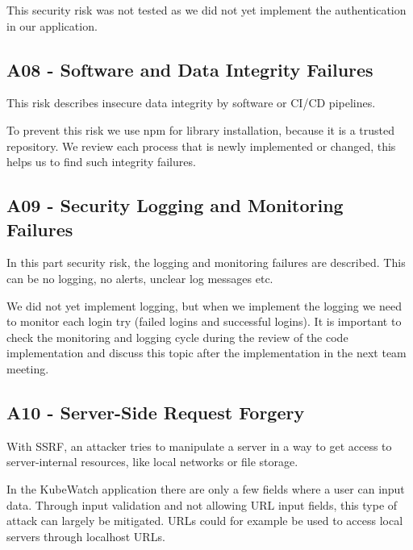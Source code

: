This security risk was not tested as we did not yet implement the authentication in our application.

\subsection{A08 - Software and Data Integrity Failures}
This risk describes insecure data integrity by software or CI/CD pipelines.

To prevent this risk we use npm for library installation, because it is a trusted repository. We review each process that is newly implemented or changed, this helps us to find such integrity failures.

\subsection{A09 - Security Logging and Monitoring Failures}
In this part security risk, the logging and monitoring failures are described. This can be no logging, no alerts, unclear log messages etc.

We did not yet implement logging, but when we implement the logging we need to monitor each login try (failed logins and successful logins). It is important to check the monitoring and logging cycle during the review of the code implementation and discuss this topic after the implementation in the next team meeting.

\subsection{A10 - Server-Side Request Forgery}
With SSRF, an attacker tries to manipulate a server in a way to get access to server-internal resources, like local networks or file storage.

In the KubeWatch application there are only a few fields where a user can input data. Through input validation and not allowing URL input fields, this type of attack can largely be mitigated. URLs could for example be used to access local servers through localhost URLs.
